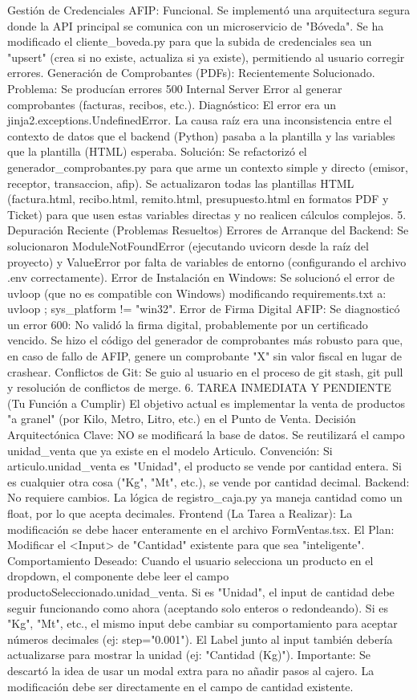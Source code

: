 Gestión de Credenciales AFIP: Funcional. Se implementó una arquitectura segura donde la API principal se comunica con un microservicio de "Bóveda". Se ha modificado el cliente_boveda.py para que la subida de credenciales sea un "upsert" (crea si no existe, actualiza si ya existe), permitiendo al usuario corregir errores.
Generación de Comprobantes (PDFs): Recientemente Solucionado.
Problema: Se producían errores 500 Internal Server Error al generar comprobantes (facturas, recibos, etc.).
Diagnóstico: El error era un jinja2.exceptions.UndefinedError. La causa raíz era una inconsistencia entre el contexto de datos que el backend (Python) pasaba a la plantilla y las variables que la plantilla (HTML) esperaba.
Solución: Se refactorizó el generador_comprobantes.py para que arme un contexto simple y directo (emisor, receptor, transaccion, afip). Se actualizaron todas las plantillas HTML (factura.html, recibo.html, remito.html, presupuesto.html en formatos PDF y Ticket) para que usen estas variables directas y no realicen cálculos complejos.
5. Depuración Reciente (Problemas Resueltos)
Errores de Arranque del Backend: Se solucionaron ModuleNotFoundError (ejecutando uvicorn desde la raíz del proyecto) y ValueError por falta de variables de entorno (configurando el archivo .env correctamente).
Error de Instalación en Windows: Se solucionó el error de uvloop (que no es compatible con Windows) modificando requirements.txt a: uvloop ; sys_platform != "win32".
Error de Firma Digital AFIP: Se diagnosticó un error 600: No validó la firma digital, probablemente por un certificado vencido. Se hizo el código del generador de comprobantes más robusto para que, en caso de fallo de AFIP, genere un comprobante "X" sin valor fiscal en lugar de crashear.
Conflictos de Git: Se guio al usuario en el proceso de git stash, git pull y resolución de conflictos de merge.
6. TAREA INMEDIATA Y PENDIENTE (Tu Función a Cumplir)
El objetivo actual es implementar la venta de productos "a granel" (por Kilo, Metro, Litro, etc.) en el Punto de Venta.
Decisión Arquitectónica Clave: NO se modificará la base de datos. Se reutilizará el campo unidad_venta que ya existe en el modelo Articulo.
Convención:
Si articulo.unidad_venta es "Unidad", el producto se vende por cantidad entera.
Si es cualquier otra cosa ("Kg", "Mt", etc.), se vende por cantidad decimal.
Backend: No requiere cambios. La lógica de registro_caja.py ya maneja cantidad como un float, por lo que acepta decimales.
Frontend (La Tarea a Realizar): La modificación se debe hacer enteramente en el archivo FormVentas.tsx.
El Plan: Modificar el <Input> de "Cantidad" existente para que sea "inteligente".
Comportamiento Deseado:
Cuando el usuario selecciona un producto en el dropdown, el componente debe leer el campo productoSeleccionado.unidad_venta.
Si es "Unidad", el input de cantidad debe seguir funcionando como ahora (aceptando solo enteros o redondeando).
Si es "Kg", "Mt", etc., el mismo input debe cambiar su comportamiento para aceptar números decimales (ej: step="0.001"). El Label junto al input también debería actualizarse para mostrar la unidad (ej: "Cantidad (Kg)").
Importante: Se descartó la idea de usar un modal extra para no añadir pasos al cajero. La modificación debe ser directamente en el campo de cantidad existente.


